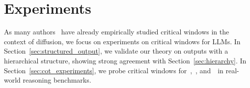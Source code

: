 
\section{Experiments}\label{sec:experiments}
As many authors~\citep{ho2020denoising,meng2022sdedit,9879163,raya2023spontaneous,georgiev2023journey,sclocchi2024probinglatenthierarchicalstructure,sclocchi2024phasetransitiondiffusionmodels,biroli2024dynamical,li2024criticalwindowsnonasymptotictheory} have already empirically studied critical windows in the context of diffusion, we focus on experiments on critical windows for LLMs. In Section~\ref{sec:structured_output}, we validate our theory on outputs with a hierarchical structure, showing strong agreement with Section~\ref{sec:hierarchy}. In Section~\ref{sec:cot_experiments}, we probe critical windows for~\llamainstruct,~\phiinstruct, and~\qweninstruct~in real-world reasoning benchmarks.


